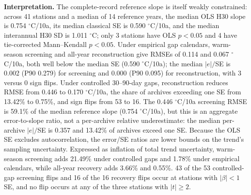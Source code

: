 \noindent\textbf{Interpretation.} The complete-record reference slope is itself weakly constrained: across 41 stations and a median of 14 reference years, the median OLS H30 slope is 0.754 $^{\circ}$C/10a, its median classical SE is 0.590 $^{\circ}$C/10a, and the median interannual H30 SD is 1.011 $^{\circ}$C; only 3 stations have OLS $p<0.05$ and 4 have tie-corrected Mann--Kendall $p<0.05$. Under empirical gap calendars, warm-season screening and all-year reconstruction give RMSEs of 0.114 and 0.067 $^{\circ}$C/10a, both well below the median SE (0.590 $^{\circ}$C/10a); the median $|e|/$SE is 0.002 (P90 0.279) for screening and 0.000 (P90 0.095) for reconstruction, with 3 versus 0 sign flips. Under controlled 30--90-day gaps, reconstruction reduces RMSE from 0.446 to 0.170 $^{\circ}$C/10a, the share of archives exceeding one SE from 13.42\% to 0.75\%, and sign flips from 53 to 16. The 0.446 $^{\circ}$C/10a screening RMSE is 59.1\% of the median reference slope (0.754 $^{\circ}$C/10a), but this is an aggregate error-to-slope ratio, not a per-archive relative underestimate: the median per-archive $|e|/$SE is 0.357 and 13.42\% of archives exceed one SE. Because the OLS SE excludes autocorrelation, the error/SE ratios are lower bounds on the trend's sampling uncertainty. Expressed as inflation of total trend uncertainty, warm-season screening adds 21.49\% under controlled gaps and 1.78\% under empirical calendars, while all-year recovery adds 3.66\% and 0.55\%. 43 of the 53 controlled-gap screening flips and 16 of the 16 recovery flips occur at stations with $|\beta|<1$ SE, and no flip occurs at any of the three stations with $|t|\ge 2$.
